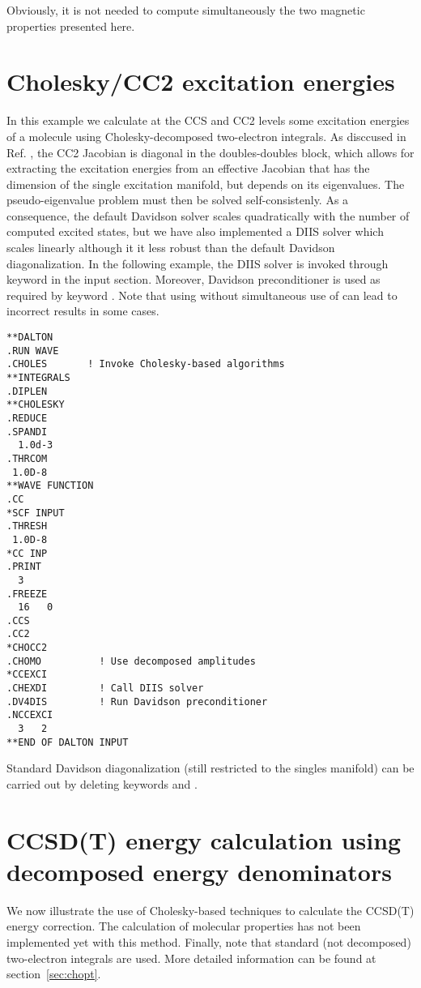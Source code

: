 Obviously, it is not needed to compute simultaneously the two
magnetic properties presented here.



\section{Cholesky/CC2 excitation energies}
In this example we calculate at the CCS and CC2 levels some excitation 
energies of a molecule using Cholesky-decomposed two-electron integrals.
As disccused in Ref. \cite{choexci}, the CC2 Jacobian is diagonal in the 
doubles-doubles block, which allows for extracting the excitation energies 
from an effective Jacobian that has the dimension of the single excitation 
manifold, but depends on its eigenvalues. The pseudo-eigenvalue problem 
must then be solved self-consistenly. As a consequence, the default Davidson
solver scales quadratically with the number of computed excited states, 
but we have also implemented a DIIS solver which scales linearly although
it it less robust than the default Davidson diagonalization. In the
following example, the DIIS solver is invoked through keyword
 in the  input section. Moreover, Davidson 
preconditioner is used as required by keyword . Note that
using  without simultaneous use of  can lead to
incorrect results in some cases.

\begin{verbatim}
**DALTON
.RUN WAVE
.CHOLES       ! Invoke Cholesky-based algorithms
**INTEGRALS
.DIPLEN
**CHOLESKY
.REDUCE
.SPANDI
  1.0d-3
.THRCOM
 1.0D-8
**WAVE FUNCTION
.CC
*SCF INPUT
.THRESH
 1.0D-8
*CC INP
.PRINT
  3
.FREEZE
  16   0
.CCS
.CC2
*CHOCC2
.CHOMO          ! Use decomposed amplitudes
*CCEXCI
.CHEXDI         ! Call DIIS solver
.DV4DIS         ! Run Davidson preconditioner
.NCCEXCI
  3   2
**END OF DALTON INPUT
\end{verbatim}

Standard Davidson diagonalization (still restricted to the singles manifold)
can be carried out by deleting keywords  and .



\section{CCSD(T) energy calculation using decomposed 
         energy denominators}

We now illustrate the use of Cholesky-based techniques to calculate
the CCSD(T) energy correction. The calculation of molecular 
properties has not been implemented yet with this method. Finally,
note that standard (not decomposed) two-electron integrals are 
used. More detailed information can be found at section~\ref{sec:chopt}.

